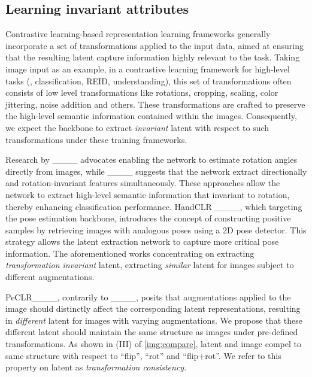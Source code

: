 \subsection{Learning invariant attributes}

Contrastive learning-based representation learning frameworks generally incorporate a set of transformations applied to the input data, aimed at ensuring that the resulting latent capture information highly relevant to the task. Taking image input as an example, in a contrastive learning framework for high-level tasks (\eg, classification, REID, understanding), this set of transformations often consists of low level transformations like rotations, cropping, scaling, color jittering, noise addition and others. These transformations are crafted to preserve the high-level semantic information contained within the images. Consequently, we expect the backbone to extract \emph{invariant} latent with respect to such transformations under these training frameworks.

Research by ____ advocates enabling the network to estimate rotation angles directly from images, while ____ suggests that the network extract directionally and rotation-invariant features simultaneously. These approaches allow the network to extract high-level semantic information that invariant to rotation, thereby enhancing classification performance. HandCLR ____, which targeting the pose estimation backbone, introduces the concept of constructing positive samples by retrieving images with analogous poses using a 2D pose detector. This strategy allows the latent extraction network to capture more critical pose information. The aforementioned works concentrating on extracting \textit{transformation invariant} latent, extracting \textit{similar} latent for images subject to different augmentations.

PeCLR____, contrarily to ____, posits that augmentations applied to the image should distinctly affect the corresponding latent representations, resulting in \textit{different} latent for images with varying augmentations. We propose that these different latent should maintain the same structure as images under pre-defined transformations. As shown in (III) of \cref{img:compare}, latent and image compel to same structure with respect to ``flip'', ``rot'' and ``flip+rot''. We refer to this property on latent as \textit{transformation consistency}.

